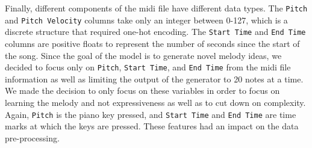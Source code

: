 \documentclass[12pt,oneside]{chicagocapstone}
\begin{document}
Finally, different components of the midi file have different data types. The \texttt{Pitch} and \texttt{Pitch\ Velocity} columns take only an integer between 0-127, which is a discrete structure that required one-hot encoding. The \texttt{Start\ Time} and \texttt{End\ Time} columns are positive floats to represent the number of seconds since the start of the song. Since the goal of the model is to generate novel melody ideas, we decided to focus only on \texttt{Pitch}, \texttt{Start\ Time}, and \texttt{End\ Time} from the midi file information as well as limiting the output of the generator to 20 notes at a time. We made the decision to only focus on these variables in order to focus on learning the melody and not expressiveness as well as to cut down on complexity. Again, \texttt{Pitch} is the piano key pressed, and \texttt{Start\ Time} and \texttt{End\ Time} are time marks at which the keys are pressed. These features had an impact on the data pre-processing.
\end{document}
